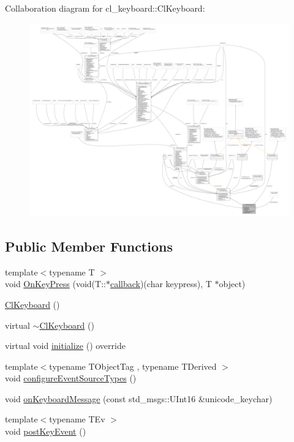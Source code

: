 Collaboration diagram for cl\+\_\+keyboard\+:\+:Cl\+Keyboard\+:
\nopagebreak
\begin{figure}[H]
\begin{center}
\leavevmode
\includegraphics[width=350pt]{classcl__keyboard_1_1ClKeyboard__coll__graph}
\end{center}
\end{figure}
\subsection*{Public Member Functions}
\begin{DoxyCompactItemize}
\item 
{\footnotesize template$<$typename T $>$ }\\void \hyperlink{classcl__keyboard_1_1ClKeyboard_ae9f4a6dc1ce18397394a432826970baa}{On\+Key\+Press} (void(T\+::$\ast$\hyperlink{sm__ridgeback__barrel__search__2_2servers_2opencv__perception__node_2opencv__perception__node_8cpp_a050e697bd654facce10ea3f6549669b3}{callback})(char keypress), T $\ast$object)
\item 
\hyperlink{classcl__keyboard_1_1ClKeyboard_aadf021c18ad32c50bd8b02f62293a47e}{Cl\+Keyboard} ()
\item 
virtual \hyperlink{classcl__keyboard_1_1ClKeyboard_af2f4ffb66639acb158d57d627a56d8e8}{$\sim$\+Cl\+Keyboard} ()
\item 
virtual void \hyperlink{classcl__keyboard_1_1ClKeyboard_af7f7fd9871ef5fcca400cd59d7b60775}{initialize} () override
\item 
{\footnotesize template$<$typename T\+Object\+Tag , typename T\+Derived $>$ }\\void \hyperlink{classcl__keyboard_1_1ClKeyboard_a9e7061e65652a6a5b8ec34ba97e59195}{configure\+Event\+Source\+Types} ()
\item 
void \hyperlink{classcl__keyboard_1_1ClKeyboard_aff50ebe6b1b4aad0ea5b933ab0f00ef4}{on\+Keyboard\+Message} (const std\+\_\+msgs\+::\+U\+Int16 \&unicode\+\_\+keychar)
\item 
{\footnotesize template$<$typename T\+Ev $>$ }\\void \hyperlink{classcl__keyboard_1_1ClKeyboard_ac1311ce9a6a64e590df2e1b088f0e733}{post\+Key\+Event} ()
\end{DoxyCompactItemize}
